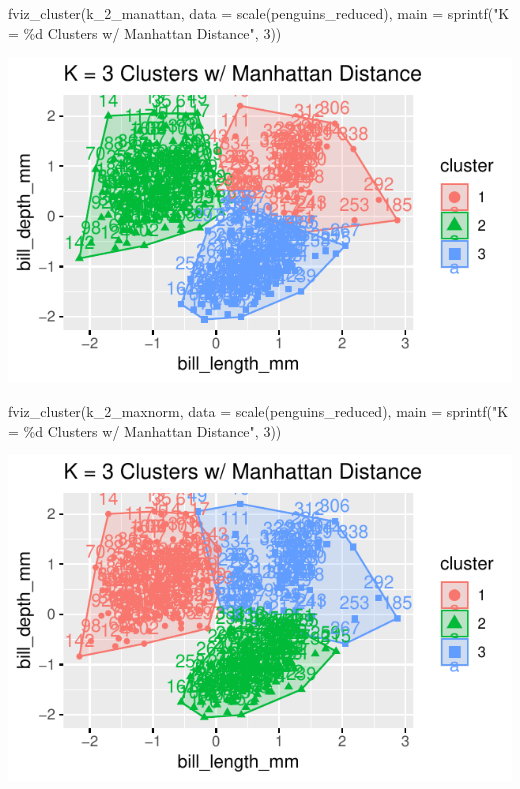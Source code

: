 \documentclass[
  letterpaper,
  DIV=11,
  numbers=noendperiod]{scrartcl}
\newenvironment{Shaded}{\begin{snugshade}}{\end{snugshade}}
\newcommand{\AttributeTok}[1]{\textcolor[rgb]{0.40,0.45,0.13}{#1}}
\newcommand{\DecValTok}[1]{\textcolor[rgb]{0.68,0.00,0.00}{#1}}
\newcommand{\FunctionTok}[1]{\textcolor[rgb]{0.28,0.35,0.67}{#1}}
\newcommand{\NormalTok}[1]{\textcolor[rgb]{0.00,0.23,0.31}{#1}}
\newcommand{\StringTok}[1]{\textcolor[rgb]{0.13,0.47,0.30}{#1}}
\begin{document}
\begin{Shaded}
\begin{Highlighting}[]
\FunctionTok{fviz\_cluster}\NormalTok{(k\_2\_manattan, }\AttributeTok{data =} \FunctionTok{scale}\NormalTok{(penguins\_reduced),}
             \AttributeTok{main =} \FunctionTok{sprintf}\NormalTok{(}\StringTok{"K = \%d Clusters w/ Manhattan Distance"}\NormalTok{, }\DecValTok{3}\NormalTok{))}
\end{Highlighting}
\end{Shaded}

\begin{center}
\includegraphics{K-Means-Mini-Demo_files/figure-pdf/unnamed-chunk-10-2.pdf}
\end{center}

\begin{Shaded}
\begin{Highlighting}[]
\FunctionTok{fviz\_cluster}\NormalTok{(k\_2\_maxnorm, }\AttributeTok{data =} \FunctionTok{scale}\NormalTok{(penguins\_reduced),}
             \AttributeTok{main =} \FunctionTok{sprintf}\NormalTok{(}\StringTok{"K = \%d Clusters w/ Manhattan Distance"}\NormalTok{, }\DecValTok{3}\NormalTok{))}
\end{Highlighting}
\end{Shaded}

\begin{center}
\includegraphics{K-Means-Mini-Demo_files/figure-pdf/unnamed-chunk-10-3.pdf}
\end{center}
\end{document}
